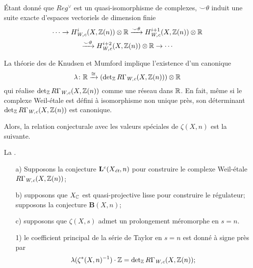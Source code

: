 \begin{otherlanguage}{french}
  Étant donné que $Reg^\vee$ est un quasi-isomorphisme de complexes,
  $\smile\theta$ induit une suite exacte d'espaces vectoriels de dimension finie
  \begin{multline*}
    \cdots \to H_\text{\it W,c}^i (X, \mathbb{Z} (n)) \otimes \mathbb{R} \xrightarrow{\smile\theta}
    H_\text{\it W,c}^{i+1} (X, \mathbb{Z} (n)) \otimes \mathbb{R} \\
    \xrightarrow{\smile\theta} H_\text{\it W,c}^{i+2} (X, \mathbb{Z} (n)) \otimes \mathbb{R} \to \cdots
  \end{multline*}

  La théorie des  de Knudsen et Mumford
  \cite{Knudsen-Mumford-76} implique l'existence d'un
   canonique
  $$\lambda\colon \mathbb{R} \xrightarrow{\cong} (\det\nolimits_{\mathbb{Z}} R\Gamma_\text{\it W,c} (X, \mathbb{Z} (n))) \otimes \mathbb{R}$$
  qui réalise $\det\nolimits_{\mathbb{Z}} R\Gamma_\text{\it W,c} (X, \mathbb{Z} (n))$ comme une
  réseau dans $\mathbb{R}$. En fait, même si le complexe Weil-étale est défini à
  isomorphisme non unique près, son déterminant
  $\det\nolimits_{\mathbb{Z}} R\Gamma_\text{\it W,c} (X, \mathbb{Z} (n))$ est canonique.

  Alors, la relation conjecturale avec les valeurs spéciales de $\zeta (X,n)$
  est la suivante.

  \vspace{1em}

  \noindent La . {\it

    \begin{enumerate}
    \item[a)] Supposons la conjecture $\mathbf{L}^c (X_\text{\it ét}, n)$ pour
      construire le complexe Weil-étale $R\Gamma_\text{\it W,c} (X, \mathbb{Z} (n))$;

    \item[b)] supposons que $X_{\mathbb{C}}$ est quasi-projective lisse pour construire
      le régulateur; supposons la conjecture $\mathbf{B} (X,n)$;

    \item[c)] supposons que $\zeta (X,s)$ admet un prolongement méromorphe en
      $s=n$.
    \end{enumerate} 
    \begin{enumerate}
    \item[1)] le coefficient principal de la série de Taylor en $s = n$ est
      donné à signe près par
      \[ \lambda (\zeta^* (X,n)^{-1})\cdot \mathbb{Z} =
        \det\nolimits_{\mathbb{Z}} R\Gamma_\text{\it W,c} (X, \mathbb{Z} (n)); \]


\end{enumerate}}
\end{otherlanguage}
